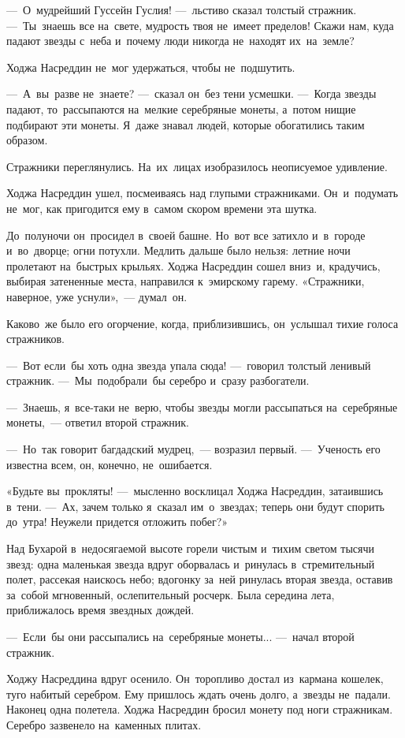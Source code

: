 \documentclass[12pt,a4paper]{book}
\begin{document}
—~О~мудрейший Гуссейн Гуслия! —~льстиво сказал толстый стражник. —~Ты~знаешь все на~свете, мудрость твоя не~имеет пределов! Скажи нам, куда падают звезды с~неба и~почему люди никогда не~находят их~на~земле?

Ходжа Насреддин не~мог удержаться, чтобы не~подшутить.

—~А~вы~разве не~знаете? —~сказал он~без тени усмешки. —~Когда звезды падают, то~рассыпаются на~мелкие серебряные монеты, а~потом нищие подбирают эти монеты. Я~даже знавал людей, которые обогатились таким образом.

Стражники переглянулись. На~их~лицах изобразилось неописуемое удивление.

Ходжа Насреддин ушел, посмеиваясь над глупыми стражниками. Он~и~подумать не~мог, как пригодится ему в~самом скором времени эта шутка.

До~полуночи он~просидел в~своей башне. Но~вот все затихло и~в~городе и~во~дворце; огни потухли. Медлить дальше было нельзя: летние ночи пролетают на~быстрых крыльях. Ходжа Насреддин сошел вниз~и, крадучись, выбирая затененные места, направился к~эмирскому гарему. «Стражники, наверное, уже уснули»,~— думал~он.

Каково~же было его огорчение, когда, приблизившись, он~услышал тихие голоса стражников.

—~Вот если~бы хоть одна звезда упала сюда! —~говорил толстый ленивый стражник. —~Мы~подобрали~бы серебро и~сразу разбогатели.

—~Знаешь, я~все-таки не~верю, чтобы звезды могли рассыпаться на~серебряные монеты,~— ответил второй стражник.

—~Но~так говорит багдадский мудрец,~— возразил первый. —~Ученость его известна всем, он, конечно, не~ошибается.

«Будьте вы~прокляты! —~мысленно восклицал Ходжа Насреддин, затаившись в~тени. —~Ах, зачем только я~сказал им~о~звездах; теперь они будут спорить до~утра! Неужели придется отложить побег?»

Над Бухарой в~недосягаемой высоте горели чистым и~тихим светом тысячи звезд: одна маленькая звезда вдруг оборвалась и~ринулась в~стремительный полет, рассекая наискось небо; вдогонку за~ней ринулась вторая звезда, оставив за~собой мгновенный, ослепительный росчерк. Была середина лета, приближалось время звездных дождей.

—~Если~бы они рассыпались на~серебряные монеты... —~начал второй стражник.

Ходжу Насреддина вдруг осенило. Он~торопливо достал из~кармана кошелек, туго набитый серебром. Ему пришлось ждать очень долго, а~звезды не~падали. Наконец одна полетела. Ходжа Насреддин бросил монету под ноги стражникам. Серебро зазвенело на~каменных плитах.
\end{document}
